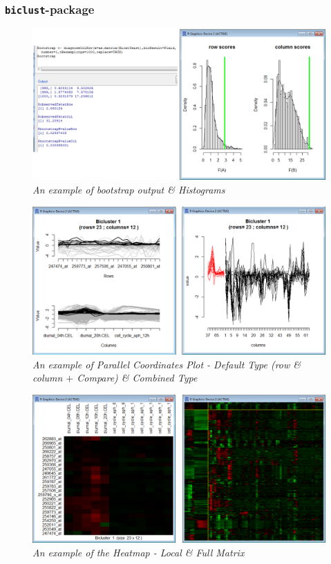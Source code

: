 \documentclass[a4paper]{article}\usepackage[]{graphicx}\usepackage[]{color}
\begin{document}
\subsubsection{\texttt{biclust}-package}
\begin{figure}[H]
\centering
\includegraphics[scale=0.4]{figures/biclustplot_example1.png}
\caption{{\it An example of bootstrap output \&
Histograms}\label{biclustplot_example1}}
\end{figure}
\begin{figure}[H]
\centering
\includegraphics[scale=0.4]{figures/biclustplot_example2.png}
\caption{{\it An example of Parallel Coordinates
Plot - Default Type (row \& column $+$ Compare) \&
Combined Type}\label{biclustplot_example2}}
\end{figure}
\begin{figure}[H]
\centering
\includegraphics[scale=0.4]{figures/biclustplot_example3.png}
\caption{{\it An example of the Heatmap - Local \&
Full Matrix}\label{biclustplot_example3}}
\end{figure}
\end{document}
